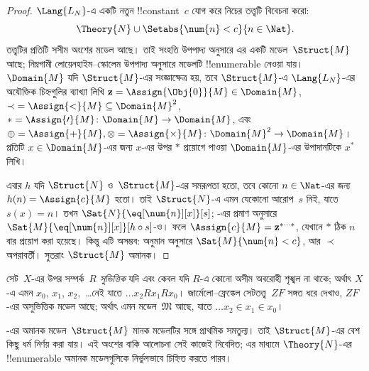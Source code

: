 \documentclass[../../../include/open-logic-section]{subfiles}
\begin{document}
\begin{proof}
$\Lang{L_N}$-এ একটি নতুন !!{constant}~$c$ যোগ করে নিচের তত্ত্বটি
বিবেচনা করো:
\[
\Theory{N} \cup \Setabs{\num{n} < c}{n \in \Nat}.
\]
তত্ত্বটির প্রতিটি সসীম অংশের মডেল আছে। তাই সংহতি উপপাদ্য অনুসারে
এর একটি মডেল~$\Struct{M}$ আছে; নিম্নগামী লোয়েনহাইম--স্কোলেম
উপপাদ্য অনুসারে মডেলটি !!{enumerable} নেওয়া যায়। $\Domain{M}$ যদি
$\Struct{M}$-এর সংজ্ঞাক্ষেত্র হয়, তবে $\Struct{M}$-এ
$\Lang{L_N}$-এর অযৌক্তিক
চিহ্নগুলির ব্যাখ্যা লিখি $\mathbf{z} = \Assign{\Obj{0}}{M} \in
\Domain{M}$, ${\prec} = \Assign{<}{M} \subseteq \Domain{M}^2$,
$* = \Assign{\prime}{M} \colon \Domain{M} \to \Domain{M}$,
এবং $\oplus = \Assign{+}{M}, \otimes = \Assign{\times}{M}
\colon \Domain{M}^2 \to \Domain{M}$। প্রতিটি $x \in \Domain{M}$-এর
জন্য $x$-এর উপর $*$ প্রয়োগে পাওয়া $\Domain{M}$-এর উপাদানটিকে $x^*$ লিখি।

এবার $h$ যদি $\Struct{N}$ ও~$\Struct{M}$-এর সমরূপতা হতো, তবে
কোনো $n \in \Nat$-এর জন্য $h(n) = \Assign{c}{M}$ হতো। তাই
$\Struct{N}$-এ এমন যেকোনো আরোপ~$s$ নিই, যাতে $s(x)=n$। তখন
$\Sat{N}{\eq[\num{n}][x]}[s]$; -এর প্রমাণ অনুসারে
$\Sat{M}{\eq[\num{n}][x]}[h \circ s]$-ও। ফলে $\Assign{c}{M} =
\mathbf{z}^{*\cdots *}$, যেখানে $*$ ঠিক $n$ বার প্রয়োগ করা হয়েছে।
কিন্তু এটি অসম্ভব: অনুমান অনুসারে $\Sat{M}{\num{n} < c}$, আর
$\prec$ অপরাবর্তী। সুতরাং $\Struct{M}$ অমানক।
\end{proof}

\begin{prob}
সেট~$X$-এর উপর সম্পর্ক~$R$ \emph{সুভিত্তিক} যদি এবং কেবল যদি
$R$-এ কোনো অসীম অবরোহী শৃঙ্খল না থাকে; অর্থাৎ $X$-এ এমন
$x_0$, $x_1$, $x_2$,~\dots নেই যাতে $\dots x_2Rx_1Rx_0$।
জার্মেলো--ফ্রেঙ্কেল সেটতত্ত্ব~$ZF$ সঙ্গত ধরে দেখাও, $ZF$-এর
অসুভিত্তিক মডেল আছে; অর্থাৎ এমন মডেল~$\mathfrak{M}$ আছে, যাতে
$\dots x_2 \in x_1 \in x_0$।
\end{prob}

-এর অমানক মডেল~$\Struct{M}$ মানক মডেলটির
সঙ্গে প্রাথমিক সমতুল্য। তাই $\Struct{M}$-এর বেশ কিছু ধর্ম
নির্ণয় করা যায়। এই অংশের বাকি আলোচনা সেই কাজেই নিবেদিত;
এর মাধ্যমে $\Theory{N}$-এর !!{enumerable} অমানক মডেলগুলিকে নির্ভুলভাবে
চিহ্নিত করতে পারব।
\end{document}
